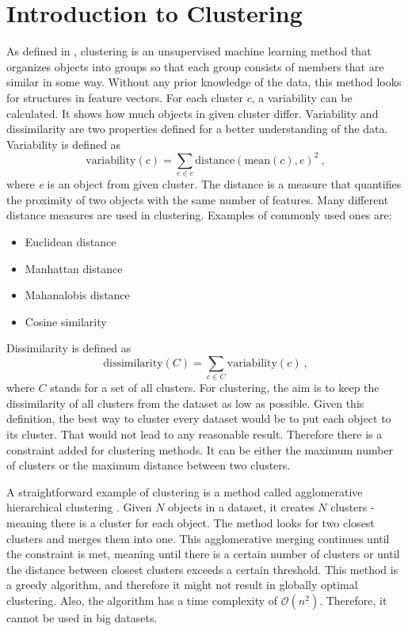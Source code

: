\documentclass[thesis=B,english]{FITthesis}[2012/10/20]
\begin{document}
\section{Introduction to Clustering}\label{sec:clust_intro}
As defined in \cite{guttag2016introduction}, clustering is an unsupervised machine learning method that organizes objects into groups so that each group consists of members that are similar in some way.
Without any prior knowledge of the data, this method looks for structures in feature vectors.
For each cluster $c$, a variability can be calculated.
It shows how much objects in given cluster differ.
Variability and dissimilarity are two properties defined for a better understanding of the data.
Variability is defined as
\begin{equation}
\mathrm{variability}(c) = \sum_{e \in c} \mathrm{distance}(\mathrm{mean}(c), e)^2\:, \tag{3}
\end{equation}
where \textit{e} is an object from given cluster.
The distance is a measure that quantifies the proximity of two objects with the same number of features.
Many different distance measures are used in clustering.
Examples of commonly used ones are:
\begin{itemize}
    \item Euclidean distance
    \item Manhattan distance
    \item Mahanalobis distance
    \item Cosine similarity
\end{itemize}

Dissimilarity is defined as
\begin{equation}
\mathrm{dissimilarity}(C) = \sum_{c \in C} \mathrm{variability}(c)\:, \tag{4}
\end{equation}
where $C$ stands for a set of all clusters.
For clustering, the aim is to keep the dissimilarity of all clusters from the dataset as low as possible.
Given this definition, the best way to cluster every dataset would be to put each object to its cluster.
That would not lead to any reasonable result.
Therefore there is a constraint added for clustering methods.
It can be either the maximum number of clusters or the maximum distance between two clusters.

A straightforward example of clustering is a method called agglomerative hierarchical clustering \cite{guttag2016introduction}.
Given $N$ objects in a dataset, it creates $N$ clusters - meaning there is a cluster for each object.
The method looks for two closest clusters and merges them into one.
This agglomerative merging continues until the constraint is met, meaning until there is a certain number of clusters or until the distance between closest clusters exceeds a certain threshold.
This method is a greedy algorithm, and therefore it might not result in globally optimal clustering.
Also, the algorithm has a time complexity of $\mathcal{O}(n^2)$.
Therefore, it cannot be used in big datasets.
\end{document}
